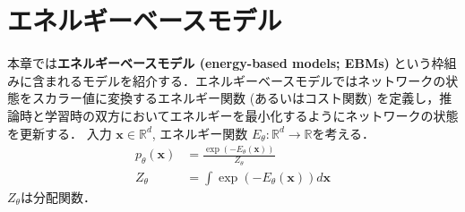 \section{エネルギーベースモデル}
本章では\textbf{エネルギーベースモデル (energy-based models; EBMs)} という枠組みに含まれるモデルを紹介する．エネルギーベースモデルではネットワークの状態をスカラー値に変換するエネルギー関数 (あるいはコスト関数) を定義し，推論時と学習時の双方においてエネルギーを最小化するようにネットワークの状態を更新する．\citep{LeCun2006-dt}
入力 $\mathbf{x}\in \mathbb{R}^d$, エネルギー関数 $E_\theta: \mathbb{R}^d\to \mathbb{R}$を考える．
\begin{align}
p_\theta(\mathbf{x})&=\frac{\exp(-E_\theta(\mathbf{x}))}{Z_\theta}\\
Z_\theta &= \int \exp(-E_\theta(\mathbf{x})) d\mathbf{x}
\end{align}
$Z_\theta$は分配関数．
